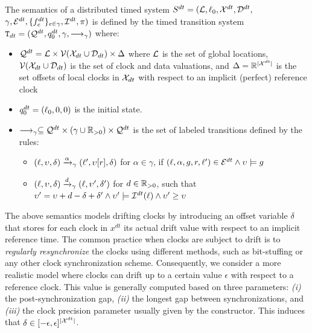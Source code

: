 \begin{property}[Semantics]
  The semantics of a distributed timed system $S^{dt}=(\mathcal{L},\ell_0,\mathcal{X}^{dt},\mathcal{D}^{dt},$\\$\gamma,
  \mathcal{E}^{dt},\{f_e^{dt}\}_{e\in\gamma},\mathcal{I}^{dt},\pi)$ is defined by the timed transition system 
  $\texttt{T}_{dt}=(\mathcal{Q}^{dt},q_0^{dt},\gamma,\longrightarrow_{\gamma})$ where:
  \begin{itemize}
    \item $\mathcal{Q}^{dt}=\mathcal{L}\times\mathcal{V}(\mathcal{X}_{dt}\cup\mathcal{D}_{dt})\times\Delta$ where $\mathcal{L}$ is 
      the set of global locations, $\mathcal{V}(\mathcal{X}_{dt}\cup\mathcal{D}_{dt})$ is the set of clock and 
      data valuations, and $\Delta=\mathbb{R}^{|\mathcal{X}^{dt}|}$ is the set offsets of local clocks in 
      $\mathcal{X}_{dt}$ with respect to an implicit (perfect) reference clock 
    \item $q_0^{dt}=(\ell_0,0,0)$ is the initial state.
    \item $\longrightarrow_{\gamma}\subseteq\mathcal{Q}^{dt}\times(\gamma\cup\mathbb{R}_{> 0})\times\mathcal{Q}^{dt}$ is the set of 
      labeled transitions defined by the rules:
    \begin{itemize}
      \item $(\ell,\upsilon,\delta)\xrightarrow{\alpha}_{\gamma}(\ell',\upsilon[r],\delta)$ for 
        $\alpha\in\gamma$, if
      $(\ell,\alpha,g,r,\ell')\in\mathcal{E}^{dt}\wedge \upsilon\models g$
    \item $(\ell,\upsilon,\delta)\xrightarrow{d}_{\gamma}(\ell,\upsilon',\delta')$ for $d\in\mathbb{R}_{> 0}$, 
      such that $\upsilon'=\upsilon+d-\delta+\delta'\wedge \upsilon'\models\mathcal{I}^{dt}(\ell)\wedge\upsilon'\ge\upsilon$
    \end{itemize}
  \end{itemize}
\end{property}

The above semantics models drifting clocks by introducing an offset variable $\delta$ that 
stores for each clock in $x^{dt}$ its actual drift value with respect to an implicit 
reference time. The common practice when clocks are subject to drift is to
\emph{regularly resynchronize} the clocks using different methods, such as bit-stuffing 
or any other clock synchronization scheme.
Consequently, we consider a more realistic model where clocks can drift up
to a certain value $\epsilon$ with respect to a reference clock. This value is generally 
computed based on three parameters: \emph{(i)} the post-synchronization gap, \emph{(ii)} 
the longest gap between synchronizations, and \emph{(iii)} the clock precision parameter 
usually given by the constructor.
This induces that $\delta\in[-\epsilon,\epsilon]^{|\mathcal{X}^{dt}|}$.


